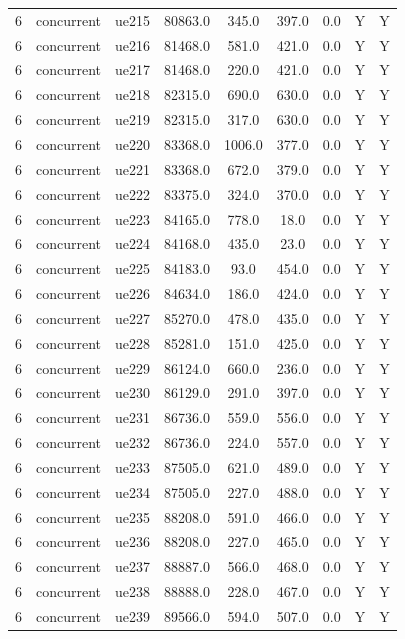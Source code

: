 \begin{table}[ht]
\begin{tabular}{|c|c|c|c|c|c|c|c|c|}
6 & concurrent & ue215 & 80863.0 & 345.0 & 397.0 & 0.0 & Y & Y \\
6 & concurrent & ue216 & 81468.0 & 581.0 & 421.0 & 0.0 & Y & Y \\
6 & concurrent & ue217 & 81468.0 & 220.0 & 421.0 & 0.0 & Y & Y \\
6 & concurrent & ue218 & 82315.0 & 690.0 & 630.0 & 0.0 & Y & Y \\
6 & concurrent & ue219 & 82315.0 & 317.0 & 630.0 & 0.0 & Y & Y \\
6 & concurrent & ue220 & 83368.0 & 1006.0 & 377.0 & 0.0 & Y & Y \\
6 & concurrent & ue221 & 83368.0 & 672.0 & 379.0 & 0.0 & Y & Y \\
6 & concurrent & ue222 & 83375.0 & 324.0 & 370.0 & 0.0 & Y & Y \\
6 & concurrent & ue223 & 84165.0 & 778.0 & 18.0 & 0.0 & Y & Y \\
6 & concurrent & ue224 & 84168.0 & 435.0 & 23.0 & 0.0 & Y & Y \\
6 & concurrent & ue225 & 84183.0 & 93.0 & 454.0 & 0.0 & Y & Y \\
6 & concurrent & ue226 & 84634.0 & 186.0 & 424.0 & 0.0 & Y & Y \\
6 & concurrent & ue227 & 85270.0 & 478.0 & 435.0 & 0.0 & Y & Y \\
6 & concurrent & ue228 & 85281.0 & 151.0 & 425.0 & 0.0 & Y & Y \\
6 & concurrent & ue229 & 86124.0 & 660.0 & 236.0 & 0.0 & Y & Y \\
6 & concurrent & ue230 & 86129.0 & 291.0 & 397.0 & 0.0 & Y & Y \\
6 & concurrent & ue231 & 86736.0 & 559.0 & 556.0 & 0.0 & Y & Y \\
6 & concurrent & ue232 & 86736.0 & 224.0 & 557.0 & 0.0 & Y & Y \\
6 & concurrent & ue233 & 87505.0 & 621.0 & 489.0 & 0.0 & Y & Y \\
6 & concurrent & ue234 & 87505.0 & 227.0 & 488.0 & 0.0 & Y & Y \\
6 & concurrent & ue235 & 88208.0 & 591.0 & 466.0 & 0.0 & Y & Y \\
6 & concurrent & ue236 & 88208.0 & 227.0 & 465.0 & 0.0 & Y & Y \\
6 & concurrent & ue237 & 88887.0 & 566.0 & 468.0 & 0.0 & Y & Y \\
6 & concurrent & ue238 & 88888.0 & 228.0 & 467.0 & 0.0 & Y & Y \\
6 & concurrent & ue239 & 89566.0 & 594.0 & 507.0 & 0.0 & Y & Y \\

\end{tabular}
\end{table}
